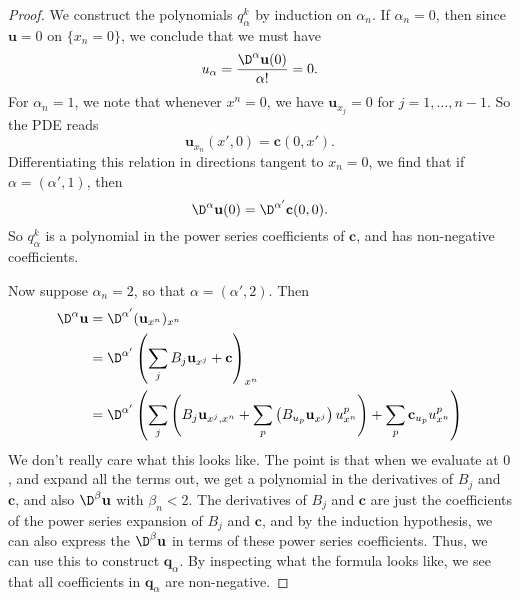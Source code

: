 \documentclass[a4paper]{article}
\begin{document}
\begin{proof}
%
  We construct the polynomials $q_\alpha^k$ by induction on $\alpha_n$. If $\alpha_n = 0$, then since $\mathbf{u} = 0$ on $\{x_n = 0\}$, we conclude that we must have
  \[
    u_\alpha = \frac{\D^\alpha \mathbf{u}(0)}{\alpha!} = 0.
  \]
  For $\alpha_n = 1$, we note that whenever $x^n = 0$, we have $\mathbf{u}_{x_j} = 0$ for $j = 1, \ldots, n - 1$. So the PDE reads
  \[
    \mathbf{u}_{x_n}(x', 0) = \mathbf{c}(0, x').
  \]
  Differentiating this relation in directions tangent to $x_n = 0$, we find that if $\alpha = (\alpha', 1)$, then
  \[
    \D^\alpha \mathbf{u}(0) = \D^{\alpha'} \mathbf{c}(0, 0).
  \]
  So $q_\alpha^k$ is a polynomial in the power series coefficients of $\mathbf{c}$, and has non-negative coefficients.

  Now suppose $\alpha_n = 2$, so that $\alpha = (\alpha', 2)$. Then
  \begin{align*}
    \D^\alpha \mathbf{u} &= \D^{\alpha'} (\mathbf{u}_{x^n})_{x^n}\\
    &= \D^{\alpha'} \left(\sum_j B_j \mathbf{u}_{x^j} + \mathbf{c}\right)_{x^n}\\
    &= \D^{\alpha'} \left(\sum_j \left(B_j \mathbf{u}_{x^j, x^n} + \sum_p \left(B_{u_p} \mathbf{u}_{x^j}\right) u^p_{x^n}\right) + \sum_p \mathbf{c}_{u_p} u^p_{x^n}\right)
  \end{align*}
  We don't really care what this looks like. The point is that when we evaluate at $0$, and expand all the terms out, we get a polynomial in the derivatives of $B_j$ and $\mathbf{c}$, and also $\D^\beta \mathbf{u}$ with $\beta_n < 2$. The derivatives of $B_j$ and $\mathbf{c}$ are just the coefficients of the power series expansion of $B_j$ and $\mathbf{c}$, and by the induction hypothesis, we can also express the $\D^\beta \mathbf{u}$ in terms of these power series coefficients. Thus, we can use this to construct $\mathbf{q}_\alpha$. By inspecting what the formula looks like, we see that all coefficients in $\mathbf{q}_\alpha$ are non-negative.


\end{proof}
\end{document}
